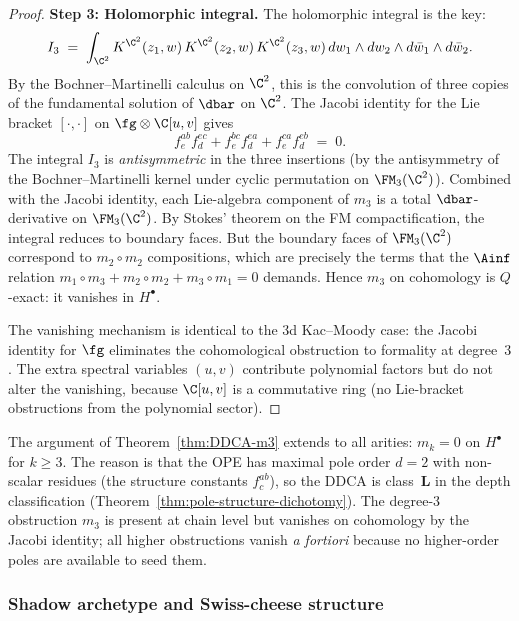 \begin{proof}
\medskip\noindent\textbf{Step 3: Holomorphic integral.}
The holomorphic integral is the key:
\[
 I_3 \;=\;
 \int_{\C^2}
 K^{\C^2}(z_1,w)\,
 K^{\C^2}(z_2,w)\,
 K^{\C^2}(z_3,w)\,
 dw_1 \wedge dw_2 \wedge d\bar w_1 \wedge d\bar w_2.
\]
By the Bochner--Martinelli calculus on $\C^2$, this is
the convolution of three copies of the fundamental
solution of $\dbar$ on $\C^2$. The Jacobi identity for
the Lie bracket $[\cdot,\cdot]$ on
$\fg \otimes \C[u,v]$ gives
\[
 f^{ab}_e f^{ec}_d + f^{bc}_e f^{ea}_d
 + f^{ca}_e f^{eb}_d \;=\; 0.
\]
The integral $I_3$ is \emph{antisymmetric} in the three
insertions (by the antisymmetry of the
Bochner--Martinelli kernel under cyclic permutation on
$\FM_3(\C^2)$). Combined with the Jacobi identity,
each Lie-algebra component of $m_3$ is a total
$\dbar$-derivative on $\FM_3(\C^2)$. By Stokes'
theorem on the FM compactification, the integral reduces
to boundary faces. But the boundary faces of
$\FM_3(\C^2)$ correspond to $m_2 \circ m_2$
compositions, which are precisely the terms that the
$\Ainf$ relation
$m_1 \circ m_3 + m_2 \circ m_2 + m_3 \circ m_1 = 0$
demands. Hence $m_3$ on cohomology is $Q$-exact: it
vanishes in $H^\bullet$.

The vanishing mechanism is identical to the 3d
Kac--Moody case: the Jacobi identity for $\fg$
eliminates the cohomological obstruction to formality at
degree~$3$. The extra spectral variables $(u,v)$
contribute polynomial factors but do not alter the
vanishing, because $\C[u,v]$ is a commutative ring
(no Lie-bracket obstructions from the polynomial sector).
\end{proof}

\begin{remark}
\label{rem:DDCA-formality}
The argument of Theorem~\ref{thm:DDCA-m3} extends to
all arities: $m_k = 0$ on $H^\bullet$ for $k \ge 3$.
The reason is that the OPE has maximal pole order $d = 2$
with non-scalar residues (the structure constants
$f^{ab}_c$), so the DDCA is class~$\mathbf{L}$ in the
depth classification
(Theorem~\ref{thm:pole-structure-dichotomy}). The
degree-$3$ obstruction $m_3$ is present at chain level but
vanishes on cohomology by the Jacobi identity; all higher
obstructions vanish \emph{a fortiori} because no
higher-order poles are available to seed them.
\end{remark}

\subsubsection{Shadow archetype and Swiss-cheese structure}


